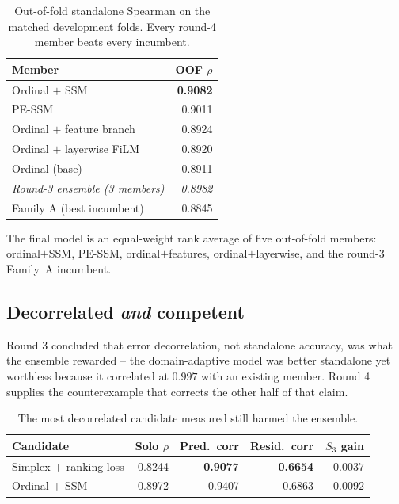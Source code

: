 \documentclass[11pt]{article}
\begin{document}
\begin{table}[H]
\centering
\caption{Out-of-fold standalone Spearman on the matched development folds. Every
round-4 member beats every incumbent.}
\label{tab:members}
\begin{tabular}{lr}
\toprule
Member & OOF $\rho$ \\
\midrule
Ordinal $+$ SSM & \textbf{0.9082} \\
PE-SSM & 0.9011 \\
Ordinal $+$ feature branch & 0.8924 \\
Ordinal $+$ layerwise FiLM & 0.8920 \\
Ordinal (base) & 0.8911 \\
\midrule
\emph{Round-3 ensemble (3 members)} & \emph{0.8982} \\
Family A (best incumbent) & 0.8845 \\
\bottomrule
\end{tabular}
\end{table}

The final model is an equal-weight rank average of five out-of-fold members:
ordinal$+$SSM, PE-SSM, ordinal$+$features, ordinal$+$layerwise, and the round-3
Family~A incumbent.

\subsection{Decorrelated \emph{and} competent}
\label{sec:decorr}

Round 3 concluded that error decorrelation, not standalone accuracy, was what the
ensemble rewarded -- the domain-adaptive model was better standalone yet worthless
because it correlated at $0.997$ with an existing member. Round 4 supplies the
counterexample that corrects the other half of that claim.

\begin{table}[H]
\centering
\caption{The most decorrelated candidate measured still harmed the ensemble.}
\label{tab:decorr}
\begin{tabular}{lrrrr}
\toprule
Candidate & Solo $\rho$ & Pred.\ corr & Resid.\ corr & $S_3$ gain \\
\midrule
Simplex $+$ ranking loss & 0.8244 & \textbf{0.9077} & \textbf{0.6654} & $\mathbf{-0.0037}$ \\
Ordinal $+$ SSM & 0.8972 & 0.9407 & 0.6863 & $+0.0092$ \\
\bottomrule
\end{tabular}
\end{table}
\end{document}

